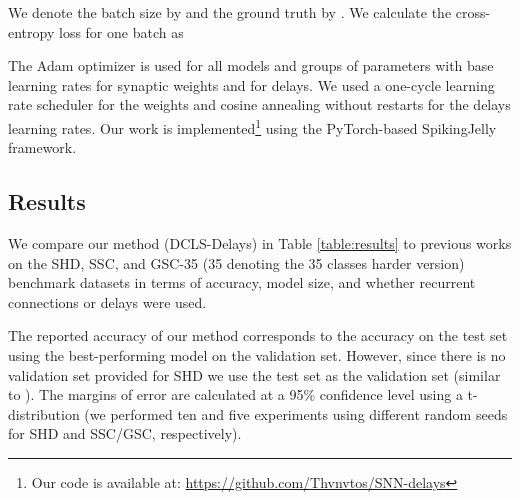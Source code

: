 \documentclass{article} \usepackage{iclr2024_conference,times}
\begin{document}
We denote the batch size by  and the ground truth by . We calculate the cross-entropy loss for one batch as






The Adam optimizer \citep{adam} is used for all models and groups of parameters with base learning rates  for synaptic weights and   for delays. We used a one-cycle learning rate scheduler \citep{one_cycle} for the weights and cosine annealing \citep{cosine_annealing} without restarts for the delays learning rates.
Our work is implemented\footnote{Our code is available at: \url{https://github.com/Thvnvtos/SNN-delays} 
} using the PyTorch-based SpikingJelly\citep{SpikingJelly,Fang2023a} framework.

\subsection{Results}

We compare our method (DCLS-Delays) in Table \ref{table:results} to previous works on the SHD, SSC, and GSC-35 (35 denoting the 35 classes harder version) benchmark datasets in terms of accuracy, model size, and whether recurrent connections or delays were used.

The reported accuracy of our method corresponds to the accuracy on the test set using the best-performing model on the validation set. However, since there is no validation set provided for SHD we use the test set as the validation set (similar to \citet{baseline}). The margins of error are calculated at a 95\% confidence level using a t-distribution (we performed ten and five experiments using different random seeds for SHD and SSC/GSC, respectively).
\end{document}
